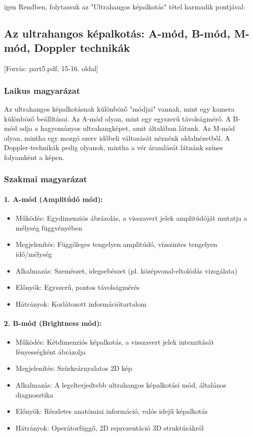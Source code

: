 \documentclass[a4paper,12pt]{article}
\begin{document}
igen
Rendben, folytassuk az "Ultrahangos képalkotás" tétel harmadik pontjával:

\subsection{Az ultrahangos képalkotás: A-mód, B-mód, M-mód, Doppler technikák} [Forrás: part5.pdf, 15-16. oldal]

\subsubsection{Laikus magyarázat} Az ultrahangos képalkotásnak különböző "módjai" vannak, mint egy kamera különböző beállításai. Az A-mód olyan, mint egy egyszerű távolságmérő. A B-mód adja a hagyományos ultrahangképet, amit általában látunk. Az M-mód olyan, mintha egy mozgó szerv időbeli változását néznénk oldalnézetből. A Doppler-technikák pedig olyanok, mintha a vér áramlását látnánk színes folyamként a képen.

\subsubsection{Szakmai magyarázat}

\paragraph{1. A-mód (Amplitúdó mód):} \begin{itemize} \item Működés: Egydimenziós ábrázolás, a visszavert jelek amplitúdóját mutatja a mélység függvényében \item Megjelenítés: Függőleges tengelyen amplitúdó, vízszintes tengelyen idő/mélység \item Alkalmazás: Szemészet, idegsebészet (pl. középvonal-eltolódás vizsgálata) \item Előnyök: Egyszerű, pontos távolságmérés \item Hátrányok: Korlátozott információtartalom \end{itemize}

\paragraph{2. B-mód (Brightness mód):} \begin{itemize} \item Működés: Kétdimenziós képalkotás, a visszavert jelek intenzitását fényességként ábrázolja \item Megjelenítés: Szürkeárnyalatos 2D kép \item Alkalmazás: A legelterjedtebb ultrahangos képalkotási mód, általános diagnosztika \item Előnyök: Részletes anatómiai információ, valós idejű képalkotás \item Hátrányok: Operátorfüggő, 2D reprezentáció 3D struktúrákról \end{itemize}
\end{document}
